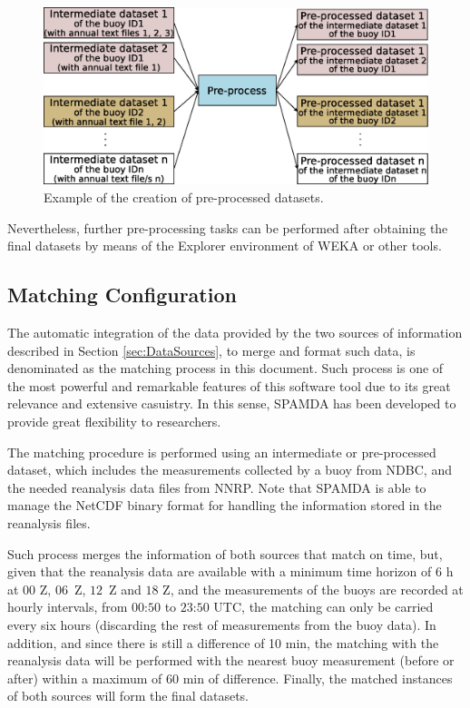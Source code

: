 \documentclass[energies,article,accept,moreauthors,pdftex]{Definitions/mdpi}
\begin{document}
\begin{paracol}{2}
				\begin{figure}[H]
					\includegraphics[scale=0.45]{figures/FigurePreprocess.eps}
					\caption{Example of the creation of pre-processed datasets.}
					\label{fig:preprocess}
				\end{figure}
				
				Nevertheless, further pre-processing tasks can be performed after obtaining the final datasets by means of the Explorer environment of WEKA or other tools.
				
				
			\subsection{Matching Configuration}
			\label{sec:matching_conf}
			
				The automatic integration of the data provided by the two sources of information described in Section \ref{sec:DataSources}, to merge and format such data, is denominated as the matching process in this document. Such process is one of the most powerful and remarkable features of this software tool due to its great relevance and extensive casuistry. In this sense, SPAMDA has been developed to provide great flexibility to researchers.
				
				The matching procedure is performed using an intermediate or pre-processed dataset, which includes the measurements collected by a buoy from NDBC, and the needed reanalysis data files from NNRP. Note that SPAMDA is able to manage the NetCDF binary format for handling the information stored in the reanalysis files.
				
				Such process merges the information of both sources that match on time, but, given that the reanalysis data are available with a minimum time horizon of $6$ h at $00$ Z, \mbox{$06$ Z}, \mbox{$12$ Z} and $18$ Z, and the measurements of the buoys are recorded at hourly intervals, from $00$:$50$ to $23$:$50$ UTC, the
matching can only be carried every six hours (discarding the rest of measurements from the buoy data). In addition, and since there is still a difference of 10 min, the matching with the reanalysis data will be performed with the nearest buoy measurement (before or after) within a maximum of 60 min of difference. Finally, the matched instances of both sources will form the final datasets.
				

\end{paracol}
\end{document}
